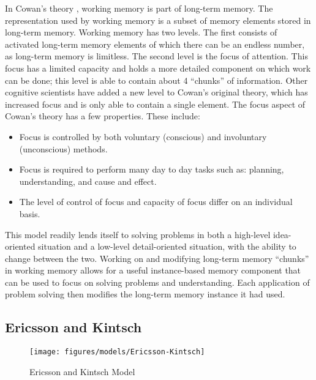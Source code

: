 In Cowan's theory \cite{ACTIVATION, ATTN_MEM}, working memory is part of long-term memory.  The representation used by working memory is a subset of memory
elements stored in long-term memory.  Working memory has two levels. The first
consists of activated long-term memory elements of which there can be an endless
number, as long-term memory is limitless.  The second level is the focus of
attention. This focus has a limited capacity and holds a more detailed component
on which work can be done; this level is able to contain about 4 ``chunks'' of
information.  Other cognitive scientists have added a new level to Cowan's
original theory, which has increased focus and is only able to contain a single
element. The focus aspect of Cowan's theory has a few properties. These include:
\begin{itemize}
	\item Focus is controlled by both voluntary (conscious) and involuntary 
	(unconscious) methods.
	\item Focus is required to perform many day to day tasks such as: planning, 
	understanding, and cause and effect.
	\item The level of control of focus and capacity of focus differ on an 
	individual basis.  
\end{itemize}    

This model readily lends itself to solving
problems in both a high-level idea-oriented situation and a low-level detail-oriented situation, with the ability to change between the two.  Working on and
modifying long-term memory ``chunks'' in working memory allows for a useful
instance-based memory component that can be used to focus on solving problems
and understanding.  Each application of problem solving then modifies the long-term memory instance it had used.

\subsection{Ericsson and Kintsch} 

\begin{figure}[htp]     
	\begin{center}
		\texttt{[image: figures/models/Ericsson-Kintsch]}
		\caption{Ericsson and Kintsch Model}     
	\end{center}     
	\label{fig:EK_MODEL}
\end{figure} 

